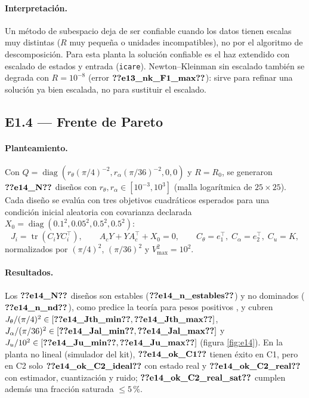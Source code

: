 \documentclass[11pt,a4paper]{article}
\begin{document}
\paragraph{Interpretación.} Un método de subespacio deja de ser confiable cuando los datos tienen escalas muy
distintas ($R$ muy pequeña o unidades incompatibles), no por el algoritmo de descomposición. Para esta planta
la solución confiable es el haz extendido con escalado de estados y entrada (\texttt{icare}). Newton--Kleinman
sin escalado también se degrada con $R=10^{-8}$ (error $\V{e13_nk_F1_max}$): sirve para refinar una solución ya
bien escalada, no para sustituir el escalado.

\subsection{E1.4 --- Frente de Pareto}
\paragraph{Planteamiento.} Con $Q=\operatorname{diag}(r_\theta(\pi/4)^{-2},r_\alpha(\pi/36)^{-2},0,0)$ y $R=R_0$, se generaron
$\V{e14_N}$ diseños con $r_\theta,r_\alpha\in[10^{-3},10^3]$ (malla logarítmica de $25\times25$). Cada diseño se
evalúa con tres objetivos cuadráticos esperados para una condición inicial aleatoria con covarianza declarada
$X_0=\operatorname{diag}(0.1^2,0.05^2,0.5^2,0.5^2)$:
\begin{equation}
J_i=\operatorname{tr}(C_iYC_i^\top),\qquad A_cY+YA_c^\top+X_0=0,\qquad C_\theta=e_1^\top,\;C_\alpha=e_2^\top,\;C_u=K,
\end{equation}
normalizados por $(\pi/4)^2$, $(\pi/36)^2$ y $V_{\max}^2=10^2$.

\paragraph{Resultados.} Los $\V{e14_N}$ diseños son estables ($\V{e14_n_estables}$) y no dominados
($\V{e14_n_nd}$), como predice la teoría para pesos positivos \cite{marler2004}, y cubren
$J_\theta/(\pi/4)^2\in[\V{e14_Jth_min},\V{e14_Jth_max}]$, $J_\alpha/(\pi/36)^2\in[\V{e14_Jal_min},\V{e14_Jal_max}]$ y
$J_u/10^2\in[\V{e14_Ju_min},\V{e14_Ju_max}]$ (figura \ref{fig:e14}). En la planta no lineal (simulador del kit),
$\V{e14_ok_C1}$ tienen éxito en C1, pero en C2 solo $\V{e14_ok_C2_ideal}$ con estado real y $\V{e14_ok_C2_real}$
con estimador, cuantización y ruido; $\V{e14_ok_C2_real_sat}$ cumplen además una fracción saturada $\le5\,\%$.
\end{document}
